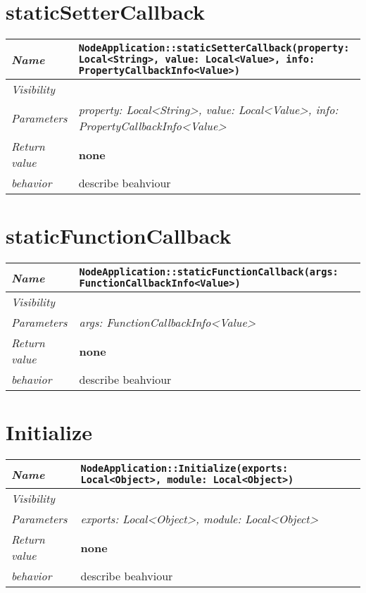  \section{staticSetterCallback}
\begin{longtable}{p{3cm} @{\hskip 1cm} p{12cm}}
 \hline
\textit{Name} & \texttt{NodeApplication::staticSetterCallback(property: Local<String>, value: Local<Value>, info: PropertyCallbackInfo<Value>)}\\
\hline
 \textit{Visibility} & \\
\hline
\textit{Parameters} & \textit{property: Local<String>, value: Local<Value>, info: PropertyCallbackInfo<Value>}\\
\hline
\textit{Return value} & \textbf{none}\\
  \hline
 \textit{behavior} & describe beahviour \\
\hline
\end{longtable} \pagebreak
 \section{staticFunctionCallback}
\begin{longtable}{p{3cm} @{\hskip 1cm} p{12cm}}
 \hline
\textit{Name} & \texttt{NodeApplication::staticFunctionCallback(args: FunctionCallbackInfo<Value>)}\\
\hline
 \textit{Visibility} & \\
\hline
\textit{Parameters} & \textit{args: FunctionCallbackInfo<Value>}\\
\hline
\textit{Return value} & \textbf{none}\\
  \hline
 \textit{behavior} & describe beahviour \\
\hline
\end{longtable} \pagebreak
 \section{Initialize}
\begin{longtable}{p{3cm} @{\hskip 1cm} p{12cm}}
 \hline
\textit{Name} & \texttt{NodeApplication::Initialize(exports: Local<Object>, module: Local<Object>)}\\
\hline
 \textit{Visibility} & \\
\hline
\textit{Parameters} & \textit{exports: Local<Object>, module: Local<Object>}\\
\hline
\textit{Return value} & \textbf{none}\\
  \hline
 \textit{behavior} & describe beahviour \\
\hline
\end{longtable} \pagebreak
